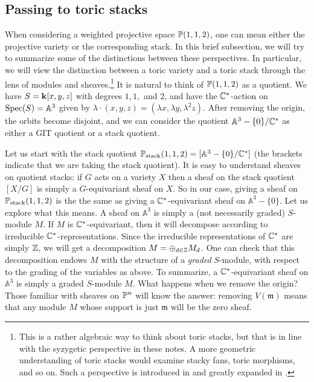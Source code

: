 \documentclass{amsart}
\begin{document}
\subsection{Passing to toric stacks}
When considering a weighted projective space $\mathbb P(1,1,2)$, one can mean either the projective variety or the corresponding stack.  In this brief subsection, we will try to summarize some of the distinctions between these perspectives.  In particular, we will view the distinction between a toric variety and a toric stack through the lens of modules and sheaves.\footnote{This is a rather algebraic way to think about toric stacks, but that is in line with the syzygetic perspective in these notes.  A more geometric understanding of toric stacks would examine stacky fans, toric morphisms, and so on.  Such a perspective is introduced in \cite{BorisovChenSmith2004} and greatly expanded in \cite{GS1, GS2}.}
It is natural to think of $\mathbb P(1,1,2)$ as a quotient.  We have $S = {\bf k}[x,y,z]$ with degrees $1,1,$ and $2$, and have the $\mathbb{C}^*$-action on $\operatorname{Spec}(S) = \mathbb A^3$ given by $\lambda \cdot (x,y,z) = (\lambda x, \lambda y, \lambda^2 z)$.  After removing the origin, the orbits become disjoint, and we can consider the quotient $\mathbb A^3 - \{0\} / \mathbb{C}^*$ as either a GIT quotient or a stack quotient.

Let us start with the stack quotient $\mathbb P_{\text{stack}}(1,1,2) = [\mathbb A^3 - \{0\} / \mathbb{C}^*]$ (the brackets indicate that we are taking the stack quotient).  It is easy to understand sheaves on quotient stacks: if $G$ acts on a variety $X$ then a sheaf on the stack quotient $[X/G]$ is simply a $G$-equivariant sheaf on $X$.  So in our case, giving a sheaf on $\mathbb P_{\text{stack}}(1,1,2) $ is the the same as giving a $\mathbb{C}^*$-equivariant sheaf on $\mathbb A^3 - \{0\}$.  Let us explore what this means.  A sheaf on $\mathbb A^3$ is simply a (not necessarily graded) $S$-module $M$.  If $M$ is $\mathbb{C}^*$-equivariant, then it will decompose according to irreducible $\mathbb{C}^*$-representations. Since the irreducible representations of $\mathbb{C}^*$ are simply $\mathbb Z$, we will get a decomposition $M=\oplus_{d\in \mathbb Z} M_d$.   One can check that this decomposition endows $M$ with the structure of a {\em graded} $S$-module, with respect to the grading of the variables as above.  To summarize, a $\mathbb{C}^*$-equivariant sheaf on $\mathbb A^3$ is simply a graded $S$-module $M$.  What happens when we remove the origin?  Those familiar with sheaves on $\mathbb P^n$ will know the answer:  removing $V(\mathfrak m)$ means that any module $M$ whose support is just $\mathfrak m$ will be the zero sheaf.
\end{document}
